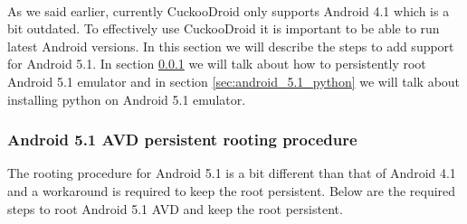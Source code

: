 \documentclass[../main.tex]{subfile}
\begin{document}
		\paragraph{} As we said earlier, currently CuckooDroid only supports Android 4.1 which is a bit outdated. To effectively use CuckooDroid it is important to be able to run latest Android versions. In this section we will describe the steps to add support for Android 5.1. In section \ref{sec:android_5.1_root} we will talk about how to persistently root Android 5.1 emulator and in section \ref{sec:android_5.1_python} we will talk about installing python on Android 5.1 emulator.
		
		\subsubsection{Android 5.1 AVD persistent rooting procedure} \label{sec:android_5.1_root}  The rooting procedure for Android 5.1 is a bit different than that of Android 4.1 and a workaround is required to keep the root persistent. Below are the required steps to root Android 5.1 AVD and keep the root persistent.
\end{document}
